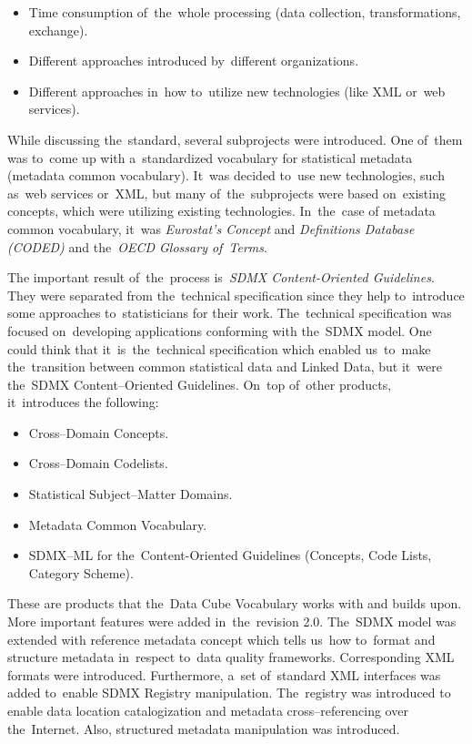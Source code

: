 \begin{itemize}
\item Time consumption of~the~whole processing (data collection, transformations, 
exchange).
\item Different approaches introduced by~different organizations.
\item Different approaches in~how to~utilize new technologies (like XML or~web 
services).
\end{itemize}

While discussing the~standard, several subprojects were introduced. One of~them was to~come
up with a~standardized vocabulary for statistical metadata (metadata common vocabulary). It~was
decided to~use new technologies, such as~web services or~XML, but many of~the~subprojects
were based on~existing concepts, which were utilizing existing technologies. In~the~case of
metadata common vocabulary, it~was \emph{Eurostat’s Concept} and
\emph{Definitions Database (CODED)} and the~\emph{OECD Glossary of~Terms}.

The important result of~the~process is~\emph{SDMX Content-Oriented Guidelines}.
They were separated
from the~technical specification since they help to~introduce some approaches to~statisticians
for their work. The~technical specification was focused on~developing applications
conforming with the~SDMX model. One could think that it~is~the~technical specification
which enabled us~to~make the~transition between common statistical data and Linked Data,
but it~were the~SDMX Content--Oriented Guidelines. On~top of~other products, it~introduces the
following:

\begin{itemize}
\item Cross--Domain Concepts.
\item Cross--Domain Codelists.
\item Statistical Subject--Matter Domains.
\item Metadata Common Vocabulary.
\item SDMX--ML for the~Content-Oriented Guidelines (Concepts, Code Lists, Category 
Scheme).
\end{itemize}

These are products that the~Data Cube Vocabulary works with and builds upon. More important
features were added in~the~revision 2.0. The~SDMX model was extended with reference metadata
concept which tells us~how to~format and structure metadata in~respect to~data quality
frameworks. Corresponding XML formats were introduced. Furthermore, a~set of~standard XML
interfaces was added to~enable SDMX Registry manipulation. The~registry was introduced to
enable data location catalogization and metadata cross--referencing over the~Internet. Also,
structured metadata manipulation was introduced.


